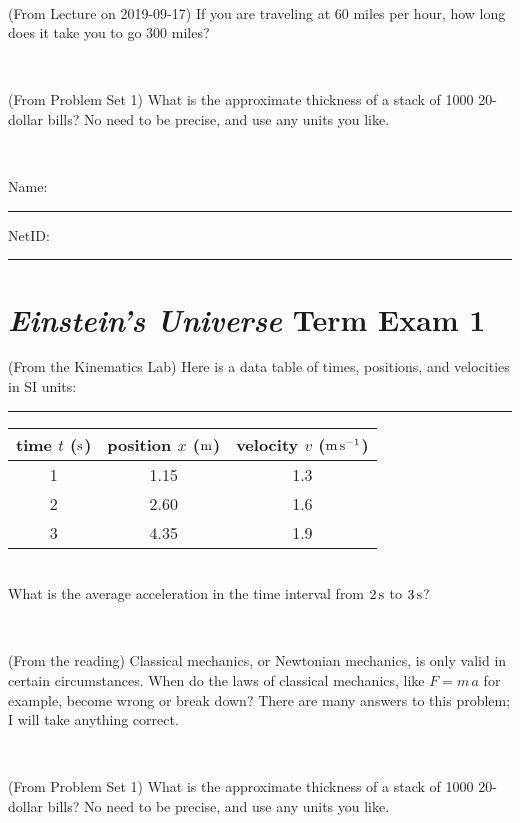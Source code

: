 \documentclass[12pt, letterpaper]{article}
\begin{document}
\vfill ~

\begin{problem} (From Lecture on 2019-09-17)
If you are traveling at 60 miles per hour, how long does
it take you to go 300 miles?
\end{problem}


\vfill ~

\begin{problem} (From Problem Set 1)
What is the approximate thickness of a stack of 1000 20-dollar bills?
No need to be precise, and use any units you like.
\end{problem}


\vfill ~


\cleardoublepage



\noindent
Name: \rule[-1ex]{0.60\textwidth}{0.1pt}
NetID: \rule[-1ex]{0.20\textwidth}{0.1pt}

\section*{\textsl{Einstein's Universe} Term Exam 1}
\setcounter{problem}{1}


\begin{problem} (From the Kinematics Lab)
Here is a data table of times, positions, and velocities in SI units:\\
\rule{1.0in}{0pt}\begin{tabular}{c|c|c}
time $t$ ($\mathrm{s}$) & position $x$ ($\mathrm{m}$) & velocity $v$ ($\mathrm{m}\,\mathrm{s}^{-1}$) \\
\hline
1 & 1.15 & 1.3 \\
2 & 2.60 & 1.6 \\
3 & 4.35 & 1.9 \\
\hline
\end{tabular}\\
What is the average acceleration in the time interval from $2\,\mathrm{s}$ to $3\,\mathrm{s}$?
\end{problem}


\vfill ~

\begin{problem} (From the reading)
Classical mechanics, or Newtonian mechanics, is only valid in certain
circumstances. When do the laws of classical mechanics, like $F =
m\,a$ for example, become wrong or break down? There are many answers
to this problem; I will take anything correct.
\end{problem}


\vfill ~

\begin{problem} (From Problem Set 1)
What is the approximate thickness of a stack of 1000 20-dollar bills?
No need to be precise, and use any units you like.
\end{problem}
\end{document}
